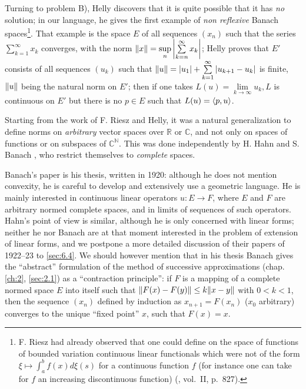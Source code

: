 \documentclass[12pt,a4paper,leqno,twoside]{extbook}
\DeclarePairedDelimiter{\norm}{\lVert}{\rVert}
\DeclarePairedDelimiter{\ip}{\langle}{\rangle}
\newcommand{\C}{\mathbb{C}}
\newcommand{\R}{\mathbb{R}}
\newcommand{\N}{\mathbb{N}}
\begin{document}
Turning to problem B), Helly discovers that it is quite possible that it has \emph{no} solution; in our language, he gives the first example of \emph{non reflexive} Banach spaces\footnote{F. Riesz had already observed that one could define on the space of functions of bounded variation continuous linear functionals which were not of the form \(\xi \mapsto \int_a^b f(x)d\xi(s)\) for a continuous function \(f\) (for instance one can take for \(f\) an increasing discontinuous function) (\cite{183}, vol.~II, p.~827).}. That example is the space \(E\) of all sequences \((x_n)\) such that the series \(\sum\limits_{k=1}^\infty x_k\) converges, with the norm \(\norm{x} = \sup\limits_n \left| \sum\limits_{k=n}^\infty x_k \right|\); Helly proves that \(E'\) consists of all sequences \((u_k)\) such that \(\norm{u} = |u_1| + \sum\limits_{k=1}^\infty |u_{k+1} - u_k|\) is finite, \(\norm{u}\) being the natural norm on \(E'\); then if one takes \(L(u) = \lim\limits_{k \to \infty} u_k, L\) is continuous on \(E'\) but there is no \(p \in E\) such that \(L(u) = \ip{p,u}\).

Starting from the work of F. Riesz and Helly, it was a natural generalization to define norms on \emph{arbitrary} vector spaces over \(\R\) or \(\C\), and not only on spaces of functions or on subspaces of \(\C^{\N}\). This was done independently by H. Hahn \cite{097} and S. Banach \cite{012}, who restrict themselves to \emph{complete} spaces.

Banach's paper is his thesis, written in 1920: although he does not mention convexity, he is careful to develop and extensively use a geometric language. He is mainly interested in continuous linear operators \(u: E \to F\), where \(E\) and \(F\) are arbitrary normed complete spaces, and in limits of sequences of such operators. Hahn's point of view is similar, although he is only concerned with linear forms; neither he nor Banach are at that moment interested in the problem of extension of linear forms, and we postpone a more detailed discussion of their papers of 1922--23 to \ref{sec:6.4}. We should however mention that in his thesis Banach gives the ``abstract'' formulation of the method of successive approximations (chap. \ref{ch:2}, \ref{sec:2.1}) as a ``contraction principle'': if \(F\) is a mapping of a complete normed space \(E\) into itself such that \(\norm{F(x)-F(y)} \leq k\norm{x-y}\) with \(0 < k < 1\), then the sequence \((x_n)\) defined by induction as \(x_{n+1} = F(x_n)\) (\(x_0\) arbitrary) converges to the unique ``fixed point'' \(x\), such that \(F(x) = x\).
\end{document}
